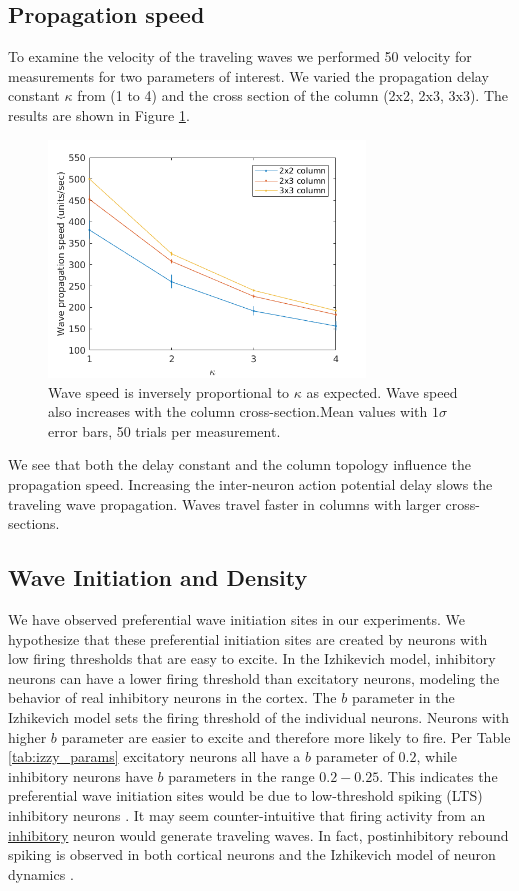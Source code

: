 \documentclass[a4paper,11pt]{article}
\begin{document}
\subsection{Propagation speed} \label{sub:propagation_speed}
To examine the velocity of the traveling waves we performed 50 velocity for measurements for two parameters of interest.
We varied the propagation delay constant $\kappa$ from (1 to 4) and the cross section of the column (2x2, 2x3, 3x3).
The results are shown in Figure \ref{fig:delay_topology}.
\begin{figure}[!htb]
 \caption{Wave speed is inversely proportional to $\kappa$ as expected. Wave speed also increases with the column cross-section.Mean values with $1\sigma$ error bars, 50 trials per measurement.}
 \label{fig:delay_topology}
 \centering
   \includegraphics[width=0.75\textwidth]{fig/WaveSpeed_DelayTopology}
\end{figure}

We see that both the delay constant and the column topology influence the propagation speed.
Increasing the inter-neuron action potential delay slows the traveling wave propagation.
Waves travel faster in columns with larger cross-sections. 

\subsection{Wave Initiation and Density} \label{sub:wave_initiation}
We have observed preferential wave initiation sites in our experiments.
We hypothesize that these preferential initiation sites are created by neurons with low firing thresholds that are easy to excite.
In the Izhikevich model, inhibitory neurons can have a lower firing threshold than excitatory neurons, modeling the behavior of real inhibitory neurons in the cortex\cite{gibson2009}.
The $b$ parameter in the Izhikevich model sets the firing threshold of the individual neurons.
Neurons with higher $b$ parameter are easier to excite and therefore more likely to fire.
Per Table \ref{tab:izzy_params} excitatory neurons all have a $b$ parameter of $0.2$, while inhibitory neurons have $b$ parameters in the range $0.2-0.25$.
This indicates the preferential wave initiation sites would be due to low-threshold spiking (LTS) inhibitory neurons \cite{izhikevich2003}.
It may seem counter-intuitive that firing activity from an \underline{inhibitory} neuron would generate traveling waves.
In fact, postinhibitory rebound spiking is observed in both cortical neurons \cite{ascoli2010} and the Izhikevich model of neuron dynamics \cite{izhikevich}.
\end{document}

